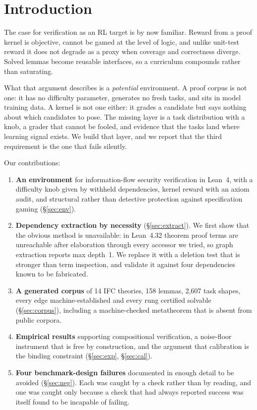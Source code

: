 \documentclass[10pt]{article}
\begin{document}
\section{Introduction}

The case for verification as an RL target is by now familiar. Reward from a
proof kernel is objective, cannot be gamed at the level of logic, and unlike
unit-test reward it does not degrade as a proxy when coverage and correctness
diverge. Solved lemmas become reusable interfaces, so a curriculum compounds
rather than saturating.

What that argument describes is a \emph{potential} environment. A proof corpus
is not one: it has no difficulty parameter, generates no fresh tasks, and sits
in model training data. A kernel is not one either: it grades a candidate but
says nothing about which candidates to pose. The missing layer is a task
distribution with a knob, a grader that cannot be fooled, and evidence that the
tasks land where learning signal exists. We build that layer, and we report that
the third requirement is the one that fails silently.

Our contributions:

\begin{enumerate}\itemsep2pt
\item \textbf{An environment} for information-flow security verification in
Lean~4, with a difficulty knob given by withheld dependencies, kernel reward
with an axiom audit, and structural rather than detective protection against
specification gaming (\S\ref{sec:env}).
\item \textbf{Dependency extraction by necessity} (\S\ref{sec:extract}). We
first show that the obvious method is unavailable: in Lean~4.32 theorem proof
terms are unreachable after elaboration through every accessor we tried, so
graph extraction reports max depth~1. We replace it with a deletion test that is
stronger than term inspection, and validate it against four dependencies known
to be fabricated.
\item \textbf{A generated corpus} of 14 IFC theories, 158 lemmas, 2{,}607 task
shapes, every edge machine-established and every rung certified solvable
(\S\ref{sec:corpus}), including a machine-checked metatheorem that is absent
from public corpora.
\item \textbf{Empirical results} supporting compositional verification, a
noise-floor instrument that is free by construction, and the argument that
calibration is the binding constraint (\S\ref{sec:exp}, \S\ref{sec:cal}).
\item \textbf{Four benchmark-design failures} documented in enough detail to be
avoided (\S\ref{sec:neg}). Each was caught by a check rather than by reading,
and one was caught only because a check that had always reported success was
itself found to be incapable of failing.
\end{enumerate}
\end{document}

